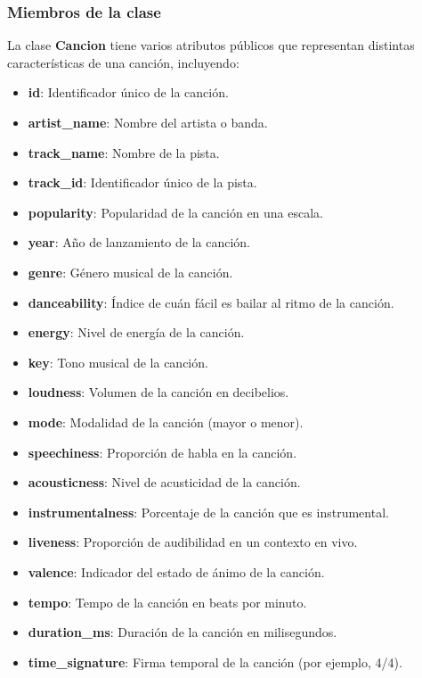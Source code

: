 \documentclass[corference]{IEEEtran}
\begin{document}
\begin{flushleft}
            \subsubsection{Miembros de la clase}
            
                \noindent\hspace*{4em}La clase \textbf{Cancion} tiene varios atributos públicos que representan distintas características de una canción, incluyendo:
                
                \begin{itemize}[left=4em]
                    \item \textbf{id}: Identificador único de la canción.
                    \item \textbf{artist\_name}: Nombre del artista o banda.
                    \item \textbf{track\_name}: Nombre de la pista.
                    \item \textbf{track\_id}: Identificador único de la pista.
                    \item \textbf{popularity}: Popularidad de la canción en una escala.
                    \item \textbf{year}: Año de lanzamiento de la canción.
                    \item \textbf{genre}: Género musical de la canción.
                    \item \textbf{danceability}: Índice de cuán fácil es bailar al ritmo de la canción.
                    \item \textbf{energy}: Nivel de energía de la canción.
                    \item \textbf{key}: Tono musical de la canción.
                    \item \textbf{loudness}: Volumen de la canción en decibelios.
                    \item \textbf{mode}: Modalidad de la canción (mayor o menor).
                    \item \textbf{speechiness}: Proporción de habla en la canción.
                    \item \textbf{acousticness}: Nivel de acusticidad de la canción.
                    \item \textbf{instrumentalness}: Porcentaje de la canción que es instrumental.
                    \item \textbf{liveness}: Proporción de audibilidad en un contexto en vivo.
                    \item \textbf{valence}: Indicador del estado de ánimo de la canción.
                    \item \textbf{tempo}: Tempo de la canción en beats por minuto.
                    \item \textbf{duration\_ms}: Duración de la canción en milisegundos.
                    \item \textbf{time\_signature}: Firma temporal de la canción (por ejemplo, 4/4).
                \end{itemize}
            

\end{flushleft}
\end{document}
